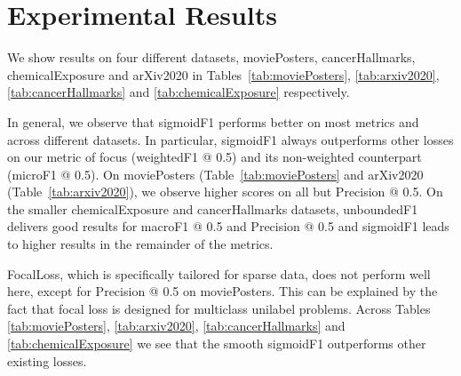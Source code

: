 
\section{Experimental Results}
\label{sec:orgc23a664}

We show results on four different datasets, moviePosters, cancerHallmarks, chemicalExposure and arXiv2020 in Tables~\ref{tab:moviePosters}, \ref{tab:arxiv2020}, \ref{tab:cancerHallmarks} and \ref{tab:chemicalExposure} respectively. 

In general, we observe that sigmoidF1 performs better on most metrics and across different datasets. In particular, sigmoidF1 always outperforms other losses on our metric of focus (weightedF1 @ 0.5) and its non-weighted counterpart (microF1 @ 0.5). On moviePosters (Table~\ref{tab:moviePosters} and arXiv2020 (Table~\ref{tab:arxiv2020}), we observe higher scores on all but Precision @ 0.5. On the smaller chemicalExposure and cancerHallmarks datasets, unboundedF1 delivers good results for macroF1 @ 0.5 and Precision @ 0.5 and sigmoidF1 leads to higher results in the remainder of the metrics.  

FocalLoss, which is specifically tailored for sparse data, does not perform well here, except for Precision @ 0.5 on moviePosters. This can be explained by the fact that focal loss is designed for multiclass unilabel problems. Across Tables \ref{tab:moviePosters}, \ref{tab:arxiv2020}, \ref{tab:cancerHallmarks} and \ref{tab:chemicalExposure} we see that the smooth sigmoidF1 outperforms other existing losses.

   


